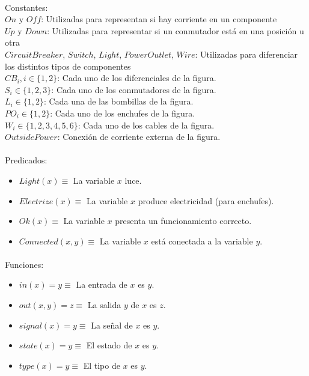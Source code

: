 \documentclass[10pt, a4paper,spanish]{article}
\begin{document}
		\paragraph{}
		Constantes: \\
		$On$ y $Off$: Utilizadas para  representan si hay corriente en un componente  \\
		$Up$ y $Down$: Utilizadas para representar si un conmutador está en una posición u otra \\
		$CircuitBreaker$, $Switch$, $Light$, $PowerOutlet$, $Wire$: Utilizadas para diferenciar los distintos tipos de componentes \\
		$CB_i, i \in \{1,2\}$: Cada uno de los diferenciales de la figura. \\
		$S_i \in \{1,2,3\}$:  Cada uno de los conmutadores de la figura.\\
		$L_i \in \{1,2\}$: Cada una de las bombillas de la figura. \\
		$PO_i \in \{1,2\}$: Cada uno de los enchufes de la figura. \\
		$W_i \in \{1,2,3,4,5,6\}$: Cada uno de los cables de la figura. \\
		$OutsidePower$: Conexión de corriente externa de la figura. \\

		\paragraph{}
		Predicados:

		\begin{itemize}
			\item $Light(x) \equiv$ La variable $x$ luce.
			\item $Electrize(x) \equiv$ La variable $x$ produce electricidad (para enchufes).
			\item $Ok(x) \equiv$ La variable $x$ presenta un funcionamiento correcto.
			\item $Connected(x, y) \equiv$ La variable $x$ está conectada a la variable $y$.
		\end{itemize}


		\paragraph{}
		Funciones:
		\begin{itemize}
			\item $in(x) = y \equiv$ La entrada de $x$ es $y$.
			\item $out(x,y) = z \equiv$ La salida $y$ de $x$ es  $z$.
			\item $signal(x) = y \equiv$ La señal de $x$ es  $y $.
			\item $state(x) = y \equiv$ El estado de $x$ es $y$.
			\item $type(x) = y \equiv$ El tipo de $x$ es $y$.
		\end{itemize}
\end{document}
